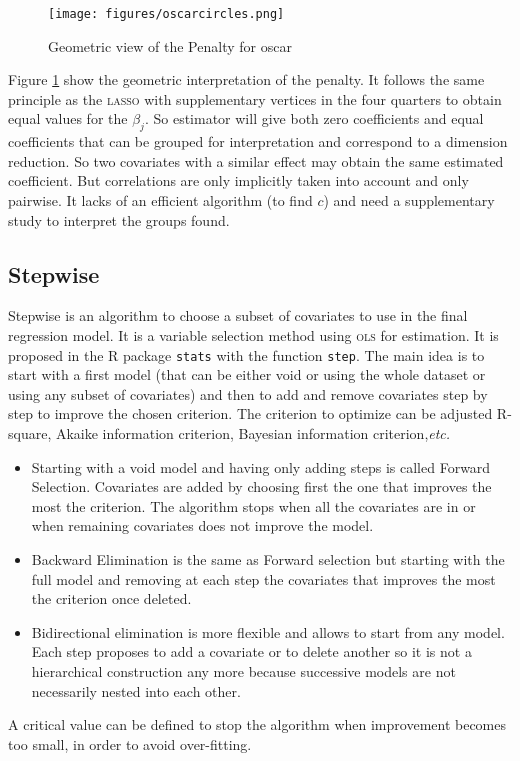 \documentclass[12pt,a4paper]{report}
\begin{document}
\begin{figure}[h!]
			\centering
			\texttt{[image: figures/oscarcircles.png]} 
			\caption{Geometric view of the Penalty for {\sc oscar}}\label{oscarcircles}
		\end{figure} 
Figure 	\ref{oscarcircles} show the geometric interpretation of the penalty. It follows the same principle as the \textsc{lasso} with supplementary vertices in the four quarters to obtain equal values for the $\beta_j$. So estimator will give both zero coefficients and equal coefficients that can be grouped for interpretation and correspond to a dimension reduction. So two covariates with a similar effect may obtain the same estimated coefficient. But correlations are only implicitly taken into account and only pairwise. It lacks of an efficient algorithm  (to find $c$) and need a supplementary study to interpret the groups found.
		\subsection{Stepwise}
			
			Stepwise \cite{seber2012linear} is an algorithm to choose a subset of covariates to use in the final regression model. It is a variable selection method using \textsc{ols} for estimation. It is proposed in the R package {\tt stats} with the function {\tt step}. The main idea is to start with a first model (that can be either void or using the whole dataset or using any subset of covariates) and then to add and remove covariates step by step to improve the chosen criterion. The criterion to optimize can be adjusted R-square, Akaike information criterion, Bayesian information criterion,{\it etc.}  \\
			\begin{itemize}
				\item 	Starting with a void model and having only adding steps is called Forward Selection. Covariates are added by choosing first the one that improves the most the criterion. The algorithm stops when all the covariates are in or when remaining covariates does not improve the model.
				\item Backward Elimination is the same as Forward selection but starting with the full model and removing at each step the covariates that improves the most the criterion once deleted.
				\item Bidirectional elimination is more flexible and allows to start from any model. Each step proposes to add a covariate or to delete another so it is not a hierarchical construction any more because successive models are not necessarily nested into each other.
			\end{itemize}
		A critical value can be defined to stop the algorithm when improvement becomes too small, in order to avoid over-fitting. \\
		
\end{document}

